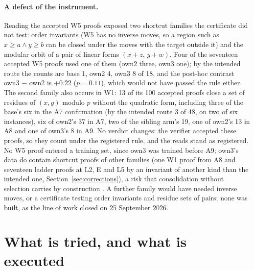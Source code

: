 \documentclass[11pt]{article}
\begin{document}
\paragraph{A defect of the instrument.} Reading the accepted W5 proofs
exposed two shortcut families the certificate did not test: order
invariants (W5 has no inverse moves, so a region such as $x\ge a\wedge y\ge b$
can be closed under the moves with the target outside it) and the modular
orbit of a pair of linear forms $(x+z,\,y+w)$. Four of the seventeen
accepted W5 proofs used one of them (own2 three, own3 one); by the
intended route the counts are base 1, own2 4, own3 8 of 18, and the
post-hoc contrast own3 $-$ own2 is $+0.22$ ($p=0.11$), which would not have
passed the rule either. The second family also occurs in W1: 13 of its
100 accepted proofs close a set of residues of $(x,y)$ modulo $p$ without
the quadratic form, including three of the base's six in the A7
confirmation (by the intended route 3 of 48, on two of six instances), six
of own2's 37 in A7, two of the sibling arm's 19, one of own2's 13 in A8
and one of own3's 8 in A9. No verdict changes: the verifier accepted these
proofs, so they count under the registered rule, and the reads stand as
registered. No W5 proof entered a training set, since own3 was trained
before A9; own3's data do contain shortcut proofs of other families (one
W1 proof from A8 and seventeen ladder proofs at L2, E and L5 by an invariant
of another kind than the intended one, Section~\ref{sec:corrections}), a
risk that consolidation without selection carries by construction
\citep{setlur2024incorrect}. A further family would have needed inverse
moves, or a certificate testing order invariants and residue sets of
pairs; none was built, as the line of work closed on 25 September 2026.

\section{What is tried, and what is executed}
\label{sec:forms}
\end{document}
